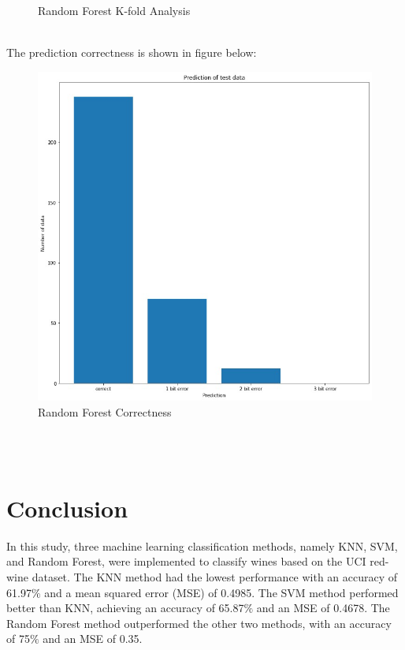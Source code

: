 \documentclass[conference]{IEEEtran}
\begin{document}
{\begin{figure}[h]
\begin{center}
	\caption{Random Forest K-fold Analysis}
	\end{center}
	\end{figure}\\
The prediction correctness is shown in figure below:\\
	\begin{figure}[h]
	\label{fig:foo}
	\begin{center}
	\includegraphics[scale=0.15]{RandomForestBar.jpeg}
	\caption{Random Forest Correctness}
	\end{center}
	\end{figure}\\
\pagebreak\\
	
\section{Conclusion}}

In this study, three machine learning classification methods, namely KNN, SVM, and Random Forest, were implemented to classify wines based on the UCI red-wine dataset. The KNN method had the lowest performance with an accuracy of 61.97$\%$ and a mean squared error (MSE) of 0.4985. The SVM method performed better than KNN, achieving an accuracy of 65.87$\%$ and an MSE of 0.4678. The Random Forest method outperformed the other two methods, with an accuracy of 75$\%$ and an MSE of 0.35.\\
\end{document}

